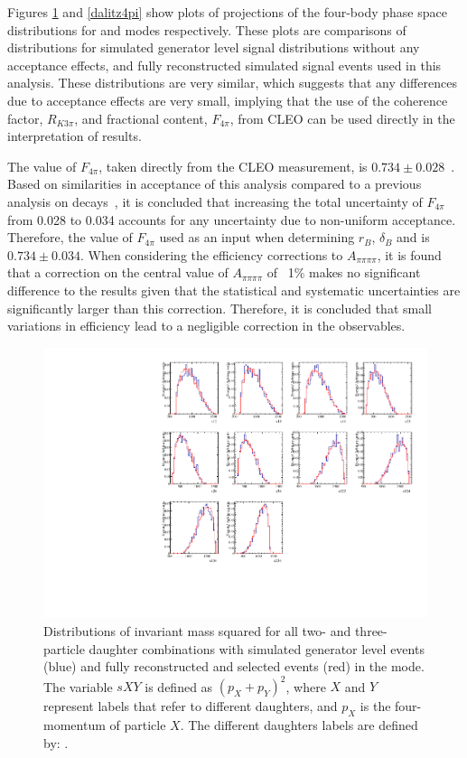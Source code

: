 Figures \ref{dalitzk3pi} and \ref{dalitz4pi} show plots of projections of the four-body phase space distributions for \kpipipi and \pipipipi modes respectively. These plots are comparisons of distributions for simulated generator level signal distributions without any acceptance effects, and fully reconstructed simulated signal events used in this analysis. These distributions are very similar, which suggests that any differences due to \lhcb acceptance effects are very small, implying that the use of the \kpipipi coherence factor, $R_{K3\pi}$, and fractional \CP content, $F_{4\pi}$, from CLEO can be used directly in the interpretation of \lhcb results. 

The value of $F_{4\pi}$, taken directly from the CLEO measurement, is $0.734 \pm 0.028$~\cite{charm4pi}. Based on similarities in acceptance of this analysis compared to a previous \lhcb analysis on \decay{\Bm}{\D\Km} decays~\cite{B2DK_ADSGLW}, it is concluded that increasing the total uncertainty of $F_{4\pi}$ from 0.028 to 0.034 accounts for any uncertainty due to non-uniform \lhcb acceptance. Therefore, the value of $F_{4\pi}$ used as an input when determining $r_B$, $\delta_B$ and \Pgamma is $0.734 \pm 0.034$. When considering the efficiency corrections to $A_{\pi\pi\pi\pi}$, it is found that a correction on the central value of $A_{\pi\pi\pi\pi}$ of ~1\% makes no significant difference to the results given that the statistical and systematic uncertainties are significantly larger than this correction. Therefore, it is concluded that small variations in efficiency lead to a negligible correction in the observables. 

\begin{figure}[h]
\centering
\includegraphics[width=0.9\linewidth]{figures/results/dalitzDist_KPiPiPi.pdf}
\caption{Distributions of invariant mass squared for all two- and three-particle \Dz daughter combinations with simulated generator level events (blue) and fully reconstructed and selected events (red) in the \kpipipi mode. The variable $sXY$ is defined as $(p_X + p_Y)^2$, where $X$ and $Y$ represent labels that refer to different \Dz daughters, and $p_X$ is the four-momentum of particle $X$. The different \Dz daughters labels are defined by: .}
\label{dalitzk3pi}
\end{figure}

